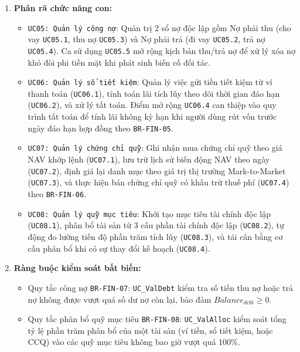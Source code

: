 \documentclass[11pt,a4paper]{article}
\providecommand{\tightlist}{
  \setlength{\itemsep}{0pt}\setlength{\parskip}{0pt}}
\begin{document}
\begin{enumerate}
\def\labelenumi{\arabic{enumi}.}
\item
  \textbf{Phân rã chức năng con:}

  \begin{itemize}
  \tightlist
  \item
    \texttt{UC05:\ Quản\ lý\ công\ nợ}: Quản trị 2 sổ nợ độc lập gồm Nợ
    phải thu (cho vay \texttt{UC05.1}, thu nợ \texttt{UC05.3}) và Nợ
    phải trả (đi vay \texttt{UC05.2}, trả nợ \texttt{UC05.4}). Ca sử
    dụng \texttt{UC05.5} mở rộng kịch bản thu/trả nợ để xử lý xóa nợ khó
    đòi phi tiền mặt khi phát sinh biến cố đối tác.
  \item
    \texttt{UC06:\ Quản\ lý\ sổ\ tiết\ kiệm}: Quản lý việc gửi tiền tiết
    kiệm từ ví thanh toán (\texttt{UC06.1}), tính toán lãi tích lũy theo
    dõi thời gian đáo hạn (\texttt{UC06.2}), và xử lý tất toán. Điểm mở
    rộng \texttt{UC06.4} can thiệp vào quy trình tất toán để tính lãi
    không kỳ hạn khi người dùng rút vốn trước ngày đáo hạn hợp đồng theo
    \texttt{BR-FIN-05}.
  \item
    \texttt{UC07:\ Quản\ lý\ chứng\ chỉ\ quỹ}: Ghi nhận mua chứng chỉ
    quỹ theo giá NAV khớp lệnh (\texttt{UC07.1}), lưu trữ lịch sử biến
    động NAV theo ngày (\texttt{UC07.2}), định giá lại danh mục theo giá
    trị thị trường Mark-to-Market (\texttt{UC07.3}), và thực hiện bán
    chứng chỉ quỹ có khấu trừ thuế phí (\texttt{UC07.4}) theo
    \texttt{BR-FIN-06}.
  \item
    \texttt{UC08:\ Quản\ lý\ quỹ\ mục\ tiêu}: Khởi tạo mục tiêu tài
    chính độc lập (\texttt{UC08.1}), phân bổ tài sản từ 3 cấu phần tài
    chính độc lập (\texttt{UC08.2}), tự động đo lường tiến độ phần trăm
    tích lũy (\texttt{UC08.3}), và tái cân bằng cơ cấu phân bổ khi có sự
    thay đổi kế hoạch (\texttt{UC08.4}).
  \end{itemize}
\item
  \textbf{Ràng buộc kiểm soát bất biến:}

  \begin{itemize}
  \tightlist
  \item
    Quy tắc công nợ \texttt{BR-FIN-07}: \texttt{UC\_ValDebt} kiểm tra số
    tiền thu nợ hoặc trả nợ không được vượt quá số dư nợ còn lại, bảo
    đảm \(Balance_{debt} \ge 0\).
  \item
    Quy tắc phân bổ quỹ mục tiêu \texttt{BR-FIN-08}:
    \texttt{UC\_ValAlloc} kiểm soát tổng tỷ lệ phần trăm phân bổ của một
    tài sản (ví tiền, sổ tiết kiệm, hoặc CCQ) vào các quỹ mục tiêu không
    bao giờ vượt quá 100\%.
  \end{itemize}
\end{enumerate}
\end{document}
